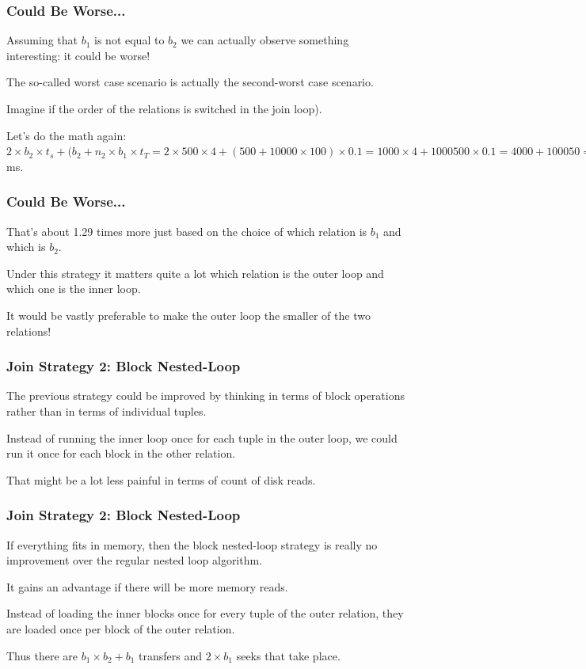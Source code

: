 \begin{frame}
\frametitle{Could Be Worse...}
Assuming that $b_{1}$ is not equal to $b_{2}$ we can actually observe something interesting: it could be worse!

 The so-called worst case scenario is actually the second-worst case scenario. 
 
Imagine if the order of the relations is switched in the join loop). 

Let's do the math again: $2 \times b_{2} \times t_{s} + (b_{2} + n_{2} \times b_{1} \times t_{T} = 2 \times 500 \times 4 + (500 + 10000 \times 100) \times 0.1 = 1000 \times 4 + 1000500 \times 0.1 = 4000 + 100050 = 104050$ ms. 

\end{frame}

\begin{frame}
\frametitle{Could Be Worse...}
 That's about 1.29 times more just based on the choice of which relation is $b_{1}$ and which is $b_{2}$.
 
 Under this strategy it matters quite a lot which relation is the outer loop and which one is the inner loop. 
 
 It would be vastly preferable to make the outer loop the smaller of the two relations!

\end{frame}

\begin{frame}
\frametitle{Join Strategy 2: Block Nested-Loop}

The previous strategy could be improved by thinking in terms of block operations rather than in terms of individual tuples. 

Instead of running the inner loop once for each tuple in the outer loop, we could run it once for each block in the other relation. 

That might be a lot less painful in terms of count of disk reads. 

\end{frame}

\begin{frame}
\frametitle{Join Strategy 2: Block Nested-Loop}

If everything fits in memory, then the block nested-loop strategy is really no improvement over the regular nested loop algorithm. 

It gains an advantage if there will be more memory reads. 

Instead of loading the inner blocks once for every tuple of the outer relation, they are loaded once per block of the outer relation.

Thus there are $b_{1} \times b_{2} + b_{1}$ transfers and $2\times b_{1}$ seeks that take place.

\end{frame}

